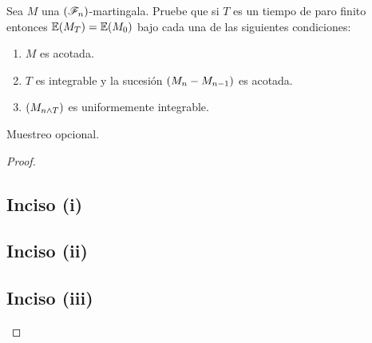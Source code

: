 \begin{problema}
Sea $M$ una $\left( \mathscr{F}_n\right) $-martingala. Pruebe que si $T$ es un tiempo de paro finito entonces $\mathbb{E}\! \left( M_T \right)=\mathbb{E}\! \left( M_0 \right)$ bajo cada una de las siguientes condiciones:
\begin{enumerate}
    \item[(i)]      [\ref{problema3_1:inciso1}]
        $M$ es acotada.
    
    \item[(ii)]     [\ref{problema3_1:inciso2}]
        $T$ es integrable y la sucesi\'on $\left( M_n-M_{n-1}\right) $ es acotada.
    
    \item[(iii)]    [\ref{problema3_1:inciso3}]
        $\left( M_{n\wedge T}\right) $ es uniformemente integrable. 
\end{enumerate}

 Muestreo opcional.
\end{problema}

\begin{proof}
    \subsection{Inciso (i)}     \label{problema3_1:inciso1}
    
    \newpage
    
    \subsection{Inciso (ii)}    \label{problema3_1:inciso2}
    
    \newpage
        
    \subsection{Inciso (iii)}   \label{problema3_1:inciso3}
    
    \newpage
\end{proof}